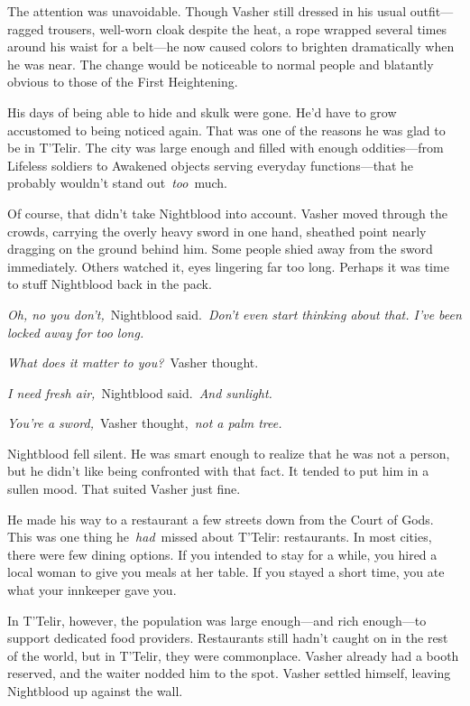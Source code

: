The attention was unavoidable. Though Vasher still dressed in his usual outfit—ragged trousers, well-worn cloak despite the heat, a rope wrapped several times around his waist for a belt—he now caused colors to brighten dramatically when he was near. The change would be noticeable to normal people and blatantly obvious to those of the First Heightening.

His days of being able to hide and skulk were gone. He’d have to grow accustomed to being noticed again. That was one of the reasons he was glad to be in T’Telir. The city was large enough and filled with enough oddities—from Lifeless soldiers to Awakened objects serving everyday functions—that he probably wouldn’t stand out~\textit{too}~much.

Of course, that didn’t take Nightblood into account. Vasher moved through the crowds, carrying the overly heavy sword in one hand, sheathed point nearly dragging on the ground behind him. Some people shied away from the sword immediately. Others watched it, eyes lingering far too long. Perhaps it was time to stuff Nightblood back in the pack.

\textit{Oh, no you don’t,}~Nightblood said.~\textit{Don’t even start thinking about that. I’ve been locked away for too long.}

\textit{What does it matter to you?}~Vasher thought.

\textit{I need fresh air,}~Nightblood said.~\textit{And sunlight.}

\textit{You’re a sword,}~Vasher thought,~\textit{not a palm tree.}

Nightblood fell silent. He was smart enough to realize that he was not a person, but he didn’t like being confronted with that fact. It tended to put him in a sullen mood. That suited Vasher just fine.

He made his way to a restaurant a few streets down from the Court of Gods. This was one thing he~\textit{had}~missed about T’Telir: restaurants. In most cities, there were few dining options. If you intended to stay for a while, you hired a local woman to give you meals at her table. If you stayed a short time, you ate what your innkeeper gave you.

In T’Telir, however, the population was large enough—and rich enough—to support dedicated food providers. Restaurants still hadn’t caught on in the rest of the world, but in T’Telir, they were commonplace. Vasher already had a booth reserved, and the waiter nodded him to the spot. Vasher settled himself, leaving Nightblood up against the wall.

